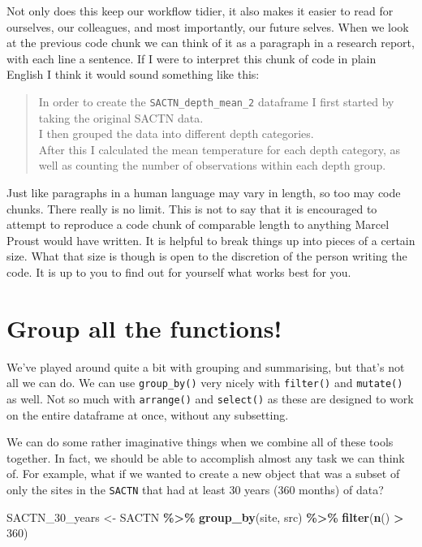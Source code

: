 \documentclass[
]{book}
\newenvironment{Shaded}{\begin{snugshade}}{\end{snugshade}}
\newcommand{\DecValTok}[1]{\textcolor[rgb]{0.00,0.00,0.81}{#1}}
\newcommand{\KeywordTok}[1]{\textcolor[rgb]{0.13,0.29,0.53}{\textbf{#1}}}
\newcommand{\NormalTok}[1]{#1}
\newcommand{\OperatorTok}[1]{\textcolor[rgb]{0.81,0.36,0.00}{\textbf{#1}}}
\newcommand{\StringTok}[1]{\textcolor[rgb]{0.31,0.60,0.02}{#1}}
\begin{document}
Not only does this keep our workflow tidier, it also makes it easier to read for ourselves, our colleagues, and most importantly, our future selves. When we look at the previous code chunk we can think of it as a paragraph in a research report, with each line a sentence. If I were to interpret this chunk of code in plain English I think it would sound something like this:

\begin{quote}
In order to create the \texttt{SACTN\_depth\_mean\_2} dataframe I first started by taking the original SACTN data.\\
I then grouped the data into different depth categories.\\
After this I calculated the mean temperature for each depth category, as well as counting the number of observations within each depth group.
\end{quote}

Just like paragraphs in a human language may vary in length, so too may code chunks. There really is no limit. This is not to say that it is encouraged to attempt to reproduce a code chunk of comparable length to anything Marcel Proust would have written. It is helpful to break things up into pieces of a certain size. What that size is though is open to the discretion of the person writing the code. It is up to you to find out for yourself what works best for you.

\hypertarget{group-all-the-functions}{%
\section{Group all the functions!}\label{group-all-the-functions}}

We've played around quite a bit with grouping and summarising, but that's not all we can do. We can use \texttt{group\_by()} very nicely with \texttt{filter()} and \texttt{mutate()} as well. Not so much with \texttt{arrange()} and \texttt{select()} as these are designed to work on the entire dataframe at once, without any subsetting.

We can do some rather imaginative things when we combine all of these tools together. In fact, we should be able to accomplish almost any task we can think of. For example, what if we wanted to create a new object that was a subset of only the sites in the \texttt{SACTN} that had at least 30 years (360 months) of data?

\begin{Shaded}
\begin{Highlighting}[]
\NormalTok{SACTN\_}\DecValTok{30}\NormalTok{\_years <{-}}\StringTok{ }\NormalTok{SACTN }\OperatorTok{\%>\%}
\StringTok{  }\KeywordTok{group\_by}\NormalTok{(site, src) }\OperatorTok{\%>\%}
\StringTok{  }\KeywordTok{filter}\NormalTok{(}\KeywordTok{n}\NormalTok{() }\OperatorTok{>}\StringTok{ }\DecValTok{360}\NormalTok{)}
\end{Highlighting}
\end{Shaded}
\end{document}
